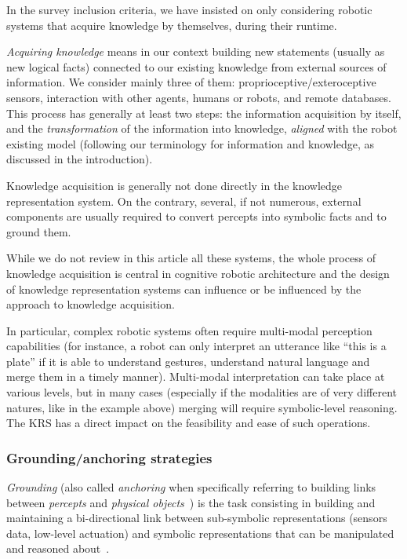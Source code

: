 \documentclass[a4paper, twocolumn]{article}
\begin{document}
In the survey inclusion criteria, we have insisted on only considering robotic
systems that acquire knowledge by themselves, during their runtime.

\emph{Acquiring knowledge} means in our context building new statements
(usually as new logical facts) connected to our existing knowledge from
external sources of information. We consider mainly three of them:
proprioceptive/exteroceptive sensors, interaction with other agents, humans or
robots, and remote databases. This process has generally at least two steps:
the information acquisition by itself, and the \emph{transformation} of the
information into knowledge, \emph{aligned} with the robot existing model
(following our terminology for information and knowledge, as discussed in the
introduction).

Knowledge acquisition is generally not done directly in the knowledge
representation system. On the contrary, several, if not numerous, external
components are usually required to convert percepts into symbolic facts and to
ground them.

While we do not review in this article all these systems, the whole process of
knowledge acquisition is central in cognitive robotic architecture and the
design of knowledge representation systems can influence or be influenced by
the approach to knowledge acquisition.

In particular, complex robotic systems often require multi-modal perception
capabilities (for instance, a robot can only interpret an utterance like ``this
is a plate'' if it is able to understand gestures, understand natural language
and merge them in a timely manner). Multi-modal interpretation can take place
at various levels, but in many cases (especially if the modalities are of very
different natures, like in the example above) merging will require
symbolic-level reasoning. The KRS has a direct impact on the feasibility and
ease of such operations.

\subsubsection{Grounding/anchoring strategies}
\label{sect|grounding}

\emph{Grounding} (also called \emph{anchoring} when specifically referring to
building links between \emph{percepts} and \emph{physical
objects}~\cite{Coradeschi2003}) is the task consisting in building and
maintaining a bi-directional link between sub-symbolic representations (sensors
data, low-level actuation) and symbolic representations that can be
manipulated and reasoned about~\cite{Harnad1990}.
\end{document}
